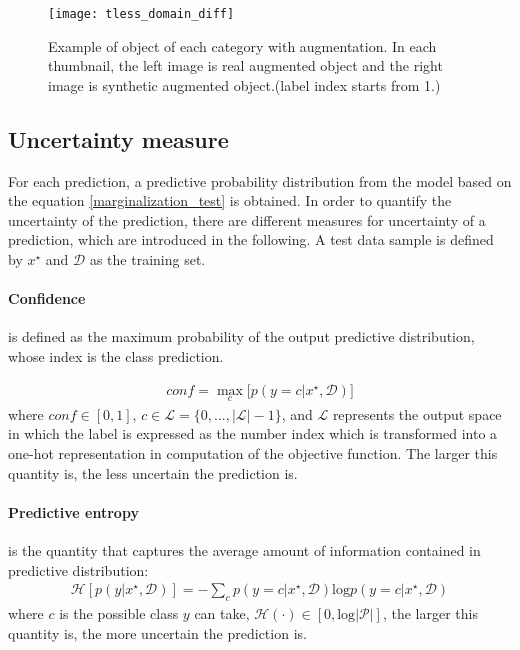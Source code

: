 \begin{figure}[H]
		\centering
		\texttt{[image: tless\_domain\_diff]}
		\caption{Example of object of each category with augmentation. In each thumbnail, the left image is real augmented object and the right image is synthetic augmented object.(label index starts from 1.)}		
		\label{fig:tless_aug}
\end{figure} 


\subsection{Uncertainty measure}
For each prediction, a predictive probability distribution from the model based on the equation \ref{marginalization_test} is obtained.
In order to quantify the uncertainty of the prediction, there are different measures for uncertainty of a prediction, which are introduced in the following.
A test data sample is defined by $x^\star$ and $\mathcal D$ as the training set. 
\paragraph{Confidence} is defined as the maximum probability of the output predictive distribution, whose index is the class prediction.

\begin{equation}\label{confidence}	
\begin{aligned}
conf = \max_c \big[ p(y=c|x^\star, \mathcal D) \big]
\end{aligned}
\end{equation}
where $conf \in [0,1]$, $c \in \mathcal L = \{0,...,|\mathcal L|-1\}$, and $\mathcal L$ represents the output space in which the label is expressed as the number index which is transformed into a one-hot representation in computation of the objective function.
The larger this quantity is, the less uncertain the prediction is. 

\paragraph{Predictive entropy} is the quantity that captures the average amount of information contained in predictive distribution\cite{shannon1948mathematical}: 
\begin{equation}\label{entropy}	
\begin{aligned}
\mathcal H[p(y|x^\star, \mathcal D)] = -\sum_{c}p(y=c|x^\star, \mathcal D)\text{log}p(y=c|x^\star, \mathcal D)
\end{aligned}
\end{equation}
where $c$ is the possible class $y$ can take, $\mathcal H(\cdot) \in [0, \text{log}{|\mathcal P|}]$, the larger this quantity is, the more uncertain the prediction is.


